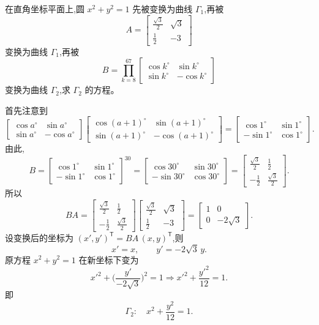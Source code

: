 \begin{questions}
    \question 在直角坐标平面上,圆 $x^{2}+y^{2}=1$ 先被变换为曲线 $\Gamma_{1}$,再被
    \[
    A=\begin{bmatrix}\frac{\sqrt{3}}{2} & \sqrt{3} \\[4pt] \frac{1}{2} & -3\end{bmatrix}
    \]
    变换为曲线 $\Gamma_{1}$,再被
    \[
    B=\prod_{k=8}^{67}\begin{bmatrix}\cos k^\circ & \sin k^\circ \\[4pt] \sin k^\circ & -\cos k^\circ\end{bmatrix}
    \]
    变换为曲线 $\Gamma_{2}$,求 $\Gamma_{2}$ 的方程。
    \begin{solution}
        首先注意到
        \[
        \begin{bmatrix}\cos a^\circ & \sin a^\circ\\[4pt] \sin a^\circ & -\cos a^\circ \end{bmatrix}
        \begin{bmatrix}\cos (a+1)^\circ & \sin (a+1)^\circ\\[4pt] \sin (a+1)^\circ & -\cos (a+1)^\circ \end{bmatrix}
        =\begin{bmatrix}\cos 1^\circ & \sin 1^\circ \\[4pt] -\sin 1^\circ & \cos 1^\circ \end{bmatrix}.
        \]
        由此,
        \[
        B=\begin{bmatrix}\cos 1^\circ & \sin 1^\circ \\[4pt] -\sin 1^\circ & \cos 1^\circ \end{bmatrix}^{30}
        =\begin{bmatrix}\cos 30^\circ & \sin 30^\circ \\[4pt] -\sin 30^\circ & \cos 30^\circ \end{bmatrix}
        =\begin{bmatrix}\tfrac{\sqrt3}{2} & \tfrac{1}{2} \\[4pt] -\tfrac{1}{2} & \tfrac{\sqrt3}{2} \end{bmatrix}.
        \]
        所以
        \[
        BA=\begin{bmatrix}\tfrac{\sqrt3}{2} & \tfrac{1}{2} \\[4pt] -\tfrac{1}{2} & \tfrac{\sqrt3}{2} \end{bmatrix}
        \begin{bmatrix}\tfrac{\sqrt3}{2} & \sqrt3 \\[4pt] \tfrac{1}{2} & -3\end{bmatrix}
        =\begin{bmatrix}1 & 0 \\[4pt] 0 & -2\sqrt3 \end{bmatrix}.
        \]
        设变换后的坐标为 $(x',y')^{\mathsf T}=BA\,(x,y)^{\mathsf T}$,则
        \[
        x'=x,\qquad y'=-2\sqrt3\,y.
        \]
        原方程 $x^{2}+y^{2}=1$ 在新坐标下变为
        \[
        x'^{2}+\Big(\frac{y'}{-2\sqrt3}\Big)^{2}=1 \Rightarrow x'^{2}+\frac{y'^{2}}{12}=1.
        \]
        即
        \[
        \Gamma_{2}:\quad x^{2}+\frac{y^{2}}{12}=1.
        \]
    \end{solution}
\end{questions}
\pagebreak

